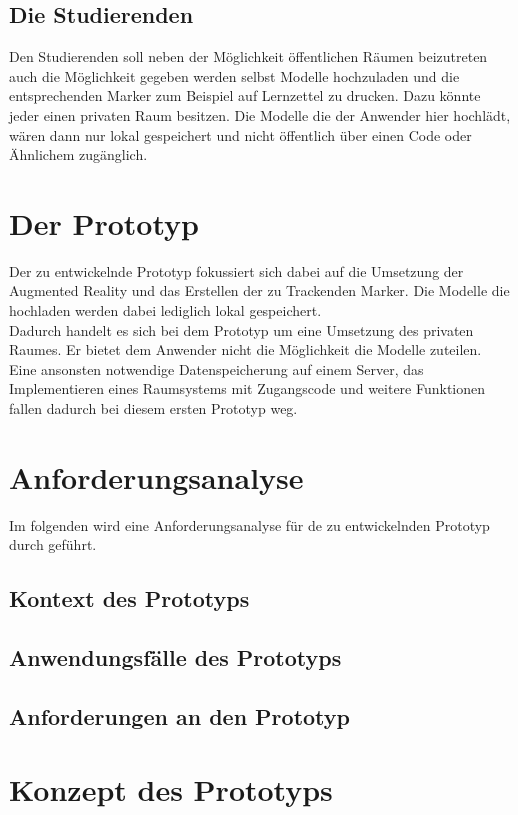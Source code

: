 \subsection{Die Studierenden}
Den Studierenden soll neben der Möglichkeit öffentlichen Räumen beizutreten auch die Möglichkeit gegeben werden selbst Modelle hochzuladen und die entsprechenden Marker zum Beispiel auf Lernzettel zu drucken. Dazu könnte jeder einen privaten Raum besitzen. Die Modelle die der Anwender hier hochlädt, wären dann nur lokal gespeichert und nicht öffentlich über einen Code oder Ähnlichem zugänglich. 

\section{Der Prototyp}
Der zu entwickelnde Prototyp fokussiert sich dabei auf die Umsetzung der Augmented Reality und das Erstellen der zu Trackenden Marker. Die Modelle die hochladen werden dabei lediglich lokal gespeichert. \\
Dadurch handelt es sich bei dem Prototyp um eine Umsetzung des \glqq privaten Raumes\grqq . Er bietet dem Anwender nicht die Möglichkeit die Modelle zuteilen.\\ 
Eine ansonsten notwendige Datenspeicherung auf einem Server, das Implementieren eines Raumsystems mit Zugangscode und weitere Funktionen fallen dadurch bei diesem ersten Prototyp weg.


\section{Anforderungsanalyse}\label{sec:Anforderungsanalyse}
Im folgenden wird eine Anforderungsanalyse für de zu entwickelnden Prototyp durch geführt.

\subsection{Kontext des Prototyps}

\subsection{Anwendungsfälle des Prototyps}

\subsection{Anforderungen an den Prototyp}

\section{Konzept des Prototyps}



